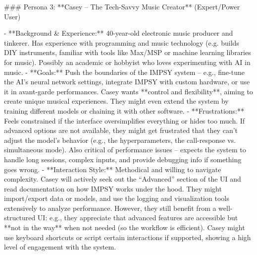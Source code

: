 ### Persona 3: **Casey – The Tech-Savvy Music Creator** (Expert/Power User)

- **Background & Experience:** 40-year-old electronic music producer and tinkerer. Has experience with programming and music technology (e.g. builds DIY instruments, familiar with tools like Max/MSP or machine learning libraries for music). Possibly an academic or hobbyist who loves experimenting with AI in music.
- **Goals:** Push the boundaries of the IMPSY system – e.g., fine-tune the AI’s neural network settings, integrate IMPSY with custom hardware, or use it in avant-garde performances. Casey wants **control and flexibility**, aiming to create unique musical experiences. They might even extend the system by training different models or chaining it with other software.
- **Frustrations:** Feels constrained if the interface oversimplifies everything or hides too much. If advanced options are not available, they might get frustrated that they can’t adjust the model’s behavior (e.g., the hyperparameters, the call-response vs. simultaneous mode). Also critical of performance issues – expects the system to handle long sessions, complex inputs, and provide debugging info if something goes wrong.
- **Interaction Style:** Methodical and willing to navigate complexity. Casey will actively seek out the “Advanced” section of the UI and read documentation on how IMPSY works under the hood. They might import/export data or models, and use the logging and visualization tools extensively to analyze performance. However, they still benefit from a well-structured UI: e.g., they appreciate that advanced features are accessible but **not in the way** when not needed (so the workflow is efficient). Casey might use keyboard shortcuts or script certain interactions if supported, showing a high level of engagement with the system.